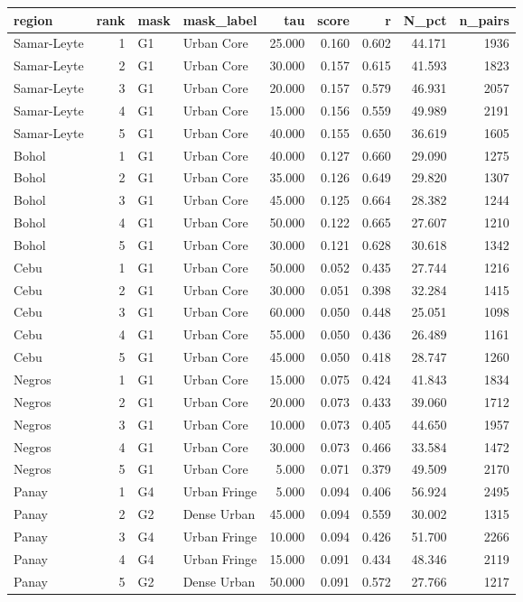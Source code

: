 \begin{tabular}{lrllrrrrr}
\toprule
region & rank & mask & mask_label & tau & score & r & N_pct & n_pairs \\
\midrule
Samar-Leyte & 1 & G1 & Urban Core & 25.000 & 0.160 & 0.602 & 44.171 & 1936 \\
Samar-Leyte & 2 & G1 & Urban Core & 30.000 & 0.157 & 0.615 & 41.593 & 1823 \\
Samar-Leyte & 3 & G1 & Urban Core & 20.000 & 0.157 & 0.579 & 46.931 & 2057 \\
Samar-Leyte & 4 & G1 & Urban Core & 15.000 & 0.156 & 0.559 & 49.989 & 2191 \\
Samar-Leyte & 5 & G1 & Urban Core & 40.000 & 0.155 & 0.650 & 36.619 & 1605 \\
Bohol & 1 & G1 & Urban Core & 40.000 & 0.127 & 0.660 & 29.090 & 1275 \\
Bohol & 2 & G1 & Urban Core & 35.000 & 0.126 & 0.649 & 29.820 & 1307 \\
Bohol & 3 & G1 & Urban Core & 45.000 & 0.125 & 0.664 & 28.382 & 1244 \\
Bohol & 4 & G1 & Urban Core & 50.000 & 0.122 & 0.665 & 27.607 & 1210 \\
Bohol & 5 & G1 & Urban Core & 30.000 & 0.121 & 0.628 & 30.618 & 1342 \\
Cebu & 1 & G1 & Urban Core & 50.000 & 0.052 & 0.435 & 27.744 & 1216 \\
Cebu & 2 & G1 & Urban Core & 30.000 & 0.051 & 0.398 & 32.284 & 1415 \\
Cebu & 3 & G1 & Urban Core & 60.000 & 0.050 & 0.448 & 25.051 & 1098 \\
Cebu & 4 & G1 & Urban Core & 55.000 & 0.050 & 0.436 & 26.489 & 1161 \\
Cebu & 5 & G1 & Urban Core & 45.000 & 0.050 & 0.418 & 28.747 & 1260 \\
Negros & 1 & G1 & Urban Core & 15.000 & 0.075 & 0.424 & 41.843 & 1834 \\
Negros & 2 & G1 & Urban Core & 20.000 & 0.073 & 0.433 & 39.060 & 1712 \\
Negros & 3 & G1 & Urban Core & 10.000 & 0.073 & 0.405 & 44.650 & 1957 \\
Negros & 4 & G1 & Urban Core & 30.000 & 0.073 & 0.466 & 33.584 & 1472 \\
Negros & 5 & G1 & Urban Core & 5.000 & 0.071 & 0.379 & 49.509 & 2170 \\
Panay & 1 & G4 & Urban Fringe & 5.000 & 0.094 & 0.406 & 56.924 & 2495 \\
Panay & 2 & G2 & Dense Urban & 45.000 & 0.094 & 0.559 & 30.002 & 1315 \\
Panay & 3 & G4 & Urban Fringe & 10.000 & 0.094 & 0.426 & 51.700 & 2266 \\
Panay & 4 & G4 & Urban Fringe & 15.000 & 0.091 & 0.434 & 48.346 & 2119 \\
Panay & 5 & G2 & Dense Urban & 50.000 & 0.091 & 0.572 & 27.766 & 1217 \\
\bottomrule
\end{tabular}
